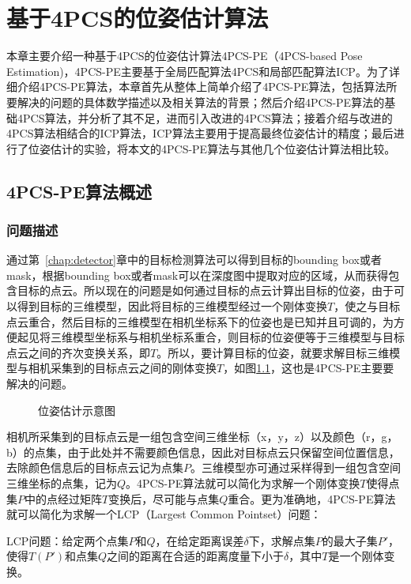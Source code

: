 \chapter{基于4PCS的位姿估计算法}
\label{chap:matcher}
本章主要介绍一种基于4PCS的位姿估计算法4PCS-PE（4PCS-based Pose Estimation)，4PCS-PE主要基于全局匹配算法4PCS\cite{aiger20084}和局部匹配算法ICP\cite{besl1992method}。为了详细介绍4PCS-PE算法，本章首先从整体上简单介绍了4PCS-PE算法，包括算法所要解决的问题的具体数学描述以及相关算法的背景；然后介绍4PCS-PE算法的基础4PCS算法，并分析了其不足，进而引入改进的4PCS算法；接着介绍与改进的4PCS算法相结合的ICP算法，ICP算法主要用于提高最终位姿估计的精度；最后进行了位姿估计的实验，将本文的4PCS-PE算法与其他几个位姿估计算法相比较。

\section{4PCS-PE算法概述}
\subsection{问题描述}
通过第~\ref{chap:detector}章中的目标检测算法可以得到目标的bounding box或者mask，根据bounding box或者mask可以在深度图中提取对应的区域，从而获得包含目标的点云。所以现在的问题是如何通过目标的点云计算出目标的位姿，由于可以得到目标的三维模型，因此将目标的三维模型经过一个刚体变换$T$，使之与目标点云重合，然后目标的三维模型在相机坐标系下的位姿也是已知并且可调的，为方便起见将三维模型坐标系与相机坐标系重合，则目标的位姿便等于三维模型与目标点云之间的齐次变换关系，即$T$。所以，要计算目标的位姿，就要求解目标三维模型与相机采集到的目标点云之间的刚体变换$T$，如图\ref{fig:match_diagram}，这也是4PCS-PE主要要解决的问题。
\begin{figure}[ht]
  \centering
  \caption{位姿估计示意图}
  \label{fig:match_diagram}
\end{figure}

相机所采集到的目标点云是一组包含空间三维坐标（x，y，z）以及颜色（r，g，b）的点集，由于此处并不需要颜色信息，因此对目标点云只保留空间位置信息，去除颜色信息后的目标点云记为点集$P$。三维模型亦可通过采样得到一组包含空间三维坐标的点集，记为$Q$。4PCS-PE算法就可以简化为求解一个刚体变换$T$使得点集$P$中的点经过矩阵$T$变换后，尽可能与点集$Q$重合。更为准确地，4PCS-PE算法就可以简化为求解一个LCP（Largest Common Pointset）问题：

{\kai LCP问题：给定两个点集$P$和$Q$，在给定距离误差$\delta$下，求解点集$P$的最大子集$P'$，使得$T(P')$和点集$Q$之间的距离在合适的距离度量下小于$\delta$，其中$T$是一个刚体变换。}

